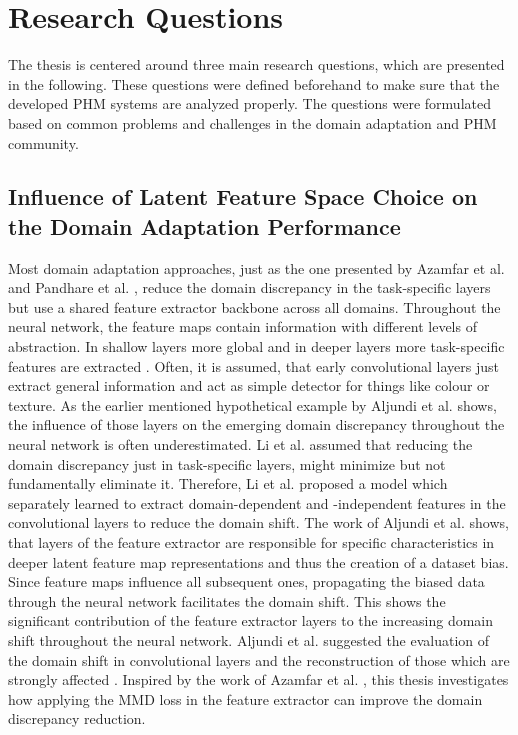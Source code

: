\chapter{Research Questions}\label{chapter:research_approach}
The thesis is centered around three main research questions, which are presented in the following. These questions were defined beforehand to make sure that the developed PHM systems are analyzed properly. The questions were formulated based on common problems and challenges in the domain adaptation and PHM community. 

\section{Influence of Latent Feature Space Choice on the Domain Adaptation Performance}
Most domain adaptation approaches, just as the one presented by Azamfar et al. \cite{AZAMFAR2020103932} and Pandhare et al. \cite{Pandhare2021}, reduce the domain discrepancy in the task-specific layers but use a shared feature extractor backbone across all domains. Throughout the neural network, the feature maps contain information with different levels of abstraction. In shallow layers more global and in deeper layers more task-specific features are extracted \cite{Aljundi2016}. Often, it is assumed, that early convolutional layers just extract general information and act as simple detector for things like colour or texture. As the earlier mentioned hypothetical example by Aljundi et al. \cite{Aljundi2016} shows, the influence of those layers on the emerging domain discrepancy throughout the neural network is often underestimated. Li et al. \cite{li2020} assumed that reducing the domain discrepancy just in task-specific layers, might minimize but not fundamentally eliminate it. Therefore, Li et al. \cite{li2020} proposed a model which separately learned to extract domain-dependent and -independent features in the convolutional layers to reduce the domain shift. The work of Aljundi et al. \cite{Aljundi2016} shows, that layers of the feature extractor are responsible for specific characteristics in deeper latent feature map representations and thus the creation of a dataset bias. Since feature maps influence all subsequent ones, propagating the biased data through the neural network facilitates the domain shift. This shows the significant contribution of the feature extractor layers to the increasing domain shift throughout the neural network. Aljundi et al. suggested the evaluation of the domain shift in convolutional layers and the reconstruction of those which are strongly affected \cite{Aljundi2016}. Inspired by the work of Azamfar et al. \cite{Aljundi2016}, this thesis investigates how applying the MMD loss in the feature extractor can improve the domain discrepancy reduction.



